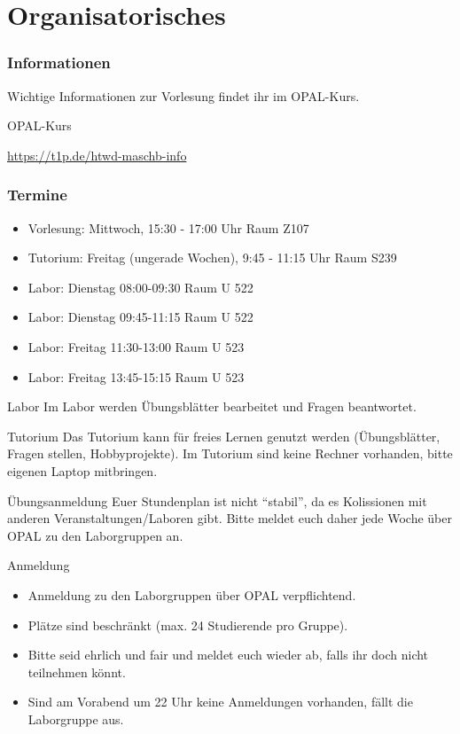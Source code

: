 \documentclass[xelatex,aspectratio=168]{beamer}
\begin{document}
\section{Organisatorisches}

\begin{frame}
  \frametitle{Informationen}
  Wichtige Informationen zur Vorlesung findet ihr im OPAL-Kurs.

  \begin{block}{OPAL-Kurs}
    \begin{center}
      \url{https://t1p.de/htwd-maschb-info}
    \end{center}
  \end{block}
\end{frame}

\begin{frame}
  \frametitle{Termine}
  \begin{itemize}
    \item Vorlesung: Mittwoch, 15:30 - 17:00 Uhr Raum Z107
    \item Tutorium: Freitag (ungerade Wochen), 9:45 - 11:15 Uhr Raum S239
    \item Labor: Dienstag 08:00-09:30 Raum U 522
    \item Labor: Dienstag 09:45-11:15 Raum U 522
    \item Labor: Freitag 11:30-13:00 Raum U 523
    \item Labor: Freitag 13:45-15:15 Raum U 523
  \end{itemize}

  \begin{block}{Labor}
    Im Labor werden Übungsblätter bearbeitet und Fragen beantwortet.
  \end{block}

  \begin{block}{Tutorium}
    Das Tutorium kann für freies Lernen genutzt werden (Übungsblätter, Fragen stellen, Hobbyprojekte). Im Tutorium sind keine Rechner vorhanden, bitte eigenen Laptop mitbringen.
  \end{block}
\end{frame}

\begin{frame}{Übungsanmeldung}
  Euer Stundenplan ist nicht \enquote{stabil}, da es Kolissionen mit anderen Veranstaltungen/Laboren gibt. Bitte meldet euch daher jede Woche über OPAL zu den Laborgruppen an.
  \begin{block}{Anmeldung}
    \begin{itemize}
      \item Anmeldung zu den Laborgruppen über OPAL verpflichtend.
      \item Plätze sind beschränkt (max. 24 Studierende pro Gruppe).
      \item Bitte seid ehrlich und fair und meldet euch wieder ab, falls ihr doch nicht teilnehmen könnt.
      \item Sind am Vorabend um 22 Uhr keine Anmeldungen vorhanden, fällt die Laborgruppe aus.
    \end{itemize}
  \end{block}
\end{frame}
\end{document}
